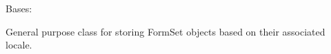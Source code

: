 \documentclass[letterpaper,10pt,english]{sphinxmanual}
\begin{document}
\begin{fulllineitems}
\label{\detokenize{apache_commons_validator_python:apache_commons_validator_python.validator_resources_new.ValidatorResources}}
\pysigstartsignatures
{}
\pysigstopsignatures
\sphinxAtStartPar
Bases: 

\sphinxAtStartPar
General purpose class for storing FormSet objects based on their associated
locale.


\end{fulllineitems}
\end{document}
